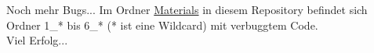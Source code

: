 \begin{frame}[fragile]{Noch mehr Bugs...}
Im Ordner \href{https://github.com/scholzp/c-lessons/tree/master/materials}{Materials} in diesem Repository befindet sich Ordner 1\_* bis 6\_* (* ist eine Wildcard) mit verbuggtem Code. \\
\bigskip
Viel Erfolg...
\end{frame}


